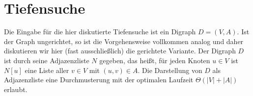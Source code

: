 \section{Tiefensuche}
\label{sect:tiefensuche}


\begin{bem} 
Die Eingabe für die hier diskutierte Tiefensuche ist ein Digraph $D=(V,A)$.
Ist der Graph ungerichtet, so ist die Vorgehensweise vollkommen analog und daher diskutieren wir hier (fast ausschließlich) die gerichtete Variante.
Der Digraph $D$ ist durch seine Adjazenzliste $N$ gegeben, das heißt, für jeden Knoten $u \in V$ ist $N[u]$ eine Liste aller $v \in V$ mit $(u,v) \in A$.
Die Darstellung von $D$ als Adjazenzliste eine Durchmusterung mit der optimalen Laufzeit $\Theta(|V|+|A|)$ erlaubt.
\end{bem}


